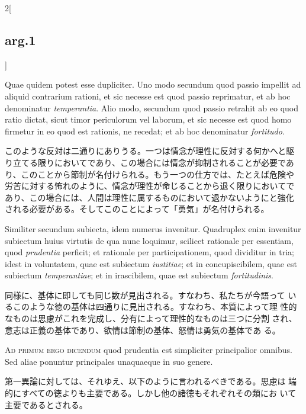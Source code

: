 \documentclass[paper=a4paper,fontsize=10pt,jafontsize=9pt,titlepage]{jlreq}
\begin{document}
\begin{paracol}{2}[\subsection{arg.1}]
\switchcolumn*

Quae quidem potest esse dupliciter. Uno modo secundum quod passio
 impellit ad aliquid contrarium rationi, et sic necesse est quod
 passio reprimatur, et ab hoc denominatur {\itshape temperantia}. Alio
 modo, secundum quod passio retrahit ab eo quod ratio dictat, sicut
 timor periculorum vel laborum, et sic necesse est quod homo firmetur
 in eo quod est rationis, ne recedat; et ab hoc denominatur {\itshape
 fortitudo}.

\switchcolumn

このような反対は二通りにありうる。一つは情念が理性に反対する何かへと駆
り立てる限りにおいてであり、この場合には情念が抑制されることが必要であ
り、このことから節制が名付けられる。もう一つの仕方では、たとえば危険や
労苦に対する怖れのように、情念が理性が命じることから退く限りにおいてで
あり、この場合には、人間は理性に属するものにおいて退かないようにと強化
される必要がある。そしてこのことによって「勇気」が名付けられる。

\switchcolumn*

Similiter secundum subiecta, idem numerus invenitur. Quadruplex enim
 invenitur subiectum huius virtutis de qua nunc loquimur, scilicet
 rationale per essentiam, quod {\itshape prudentia} perficit; et
 rationale per participationem, quod dividitur in tria; idest in
 voluntatem, quae est subiectum {\itshape iustitiae}; et in
 concupiscibilem, quae est subiectum {\itshape temperantiae}; et in
 irascibilem, quae est subiectum {\itshape fortitudinis}.

\switchcolumn

同様に、基体に即しても同じ数が見出される。すなわち、私たちが今語って
 いるこのような徳の基体は四通りに見出される。すなわち、本質によって理
 性的なものは思慮がこれを完成し、分有によって理性的なものは三つに分割
 され、意志は正義の基体であり、欲情は節制の基体、怒情は勇気の基体であ
 る。

\switchcolumn*[\subsection{ad.1}]

{\scshape Ad primum ergo dicendum} quod prudentia est simpliciter
principalior omnibus. Sed aliae ponuntur principales unaquaeque in suo
genere.

\switchcolumn

第一異論に対しては、それゆえ、以下のように言われるべきである。思慮は
 端的にすべての徳よりも主要である。しかし他の諸徳もそれぞれその類にお
 いて主要であるとされる。


\end{paracol}
\end{document}
